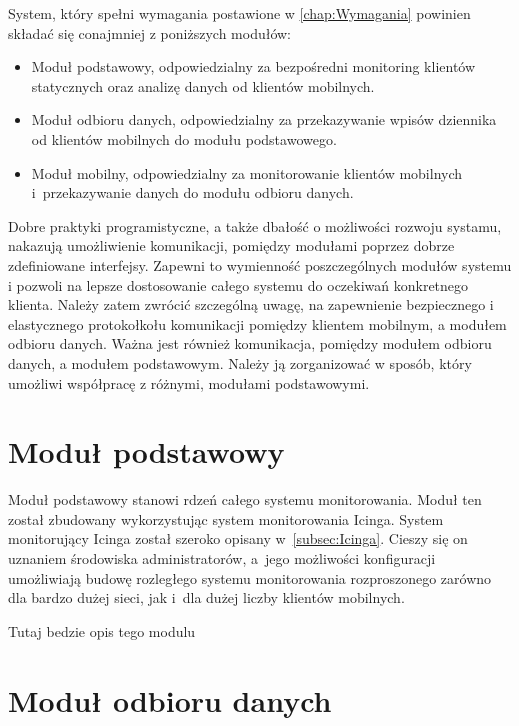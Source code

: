 System, który spełni wymagania postawione w \ref{chap:Wymagania}
powinien składać się conajmniej z poniższych modułów:

\begin{itemize}
\item Moduł podstawowy, odpowiedzialny za bezpośredni monitoring
  klientów statycznych oraz analizę danych od klientów mobilnych.
\item Moduł odbioru danych, odpowiedzialny za przekazywanie wpisów
  dziennika od klientów mobilnych do modułu podstawowego.
\item Moduł mobilny, odpowiedzialny za monitorowanie klientów
  mobilnych i~przekazywanie danych do modułu odbioru danych.
\end{itemize}


Dobre praktyki programistyczne, a także dbałość o możliwości rozwoju
systamu, nakazują umożliwienie komunikacji, pomiędzy modułami poprzez
dobrze zdefiniowane interfejsy. Zapewni to wymienność poszczególnych
modułów systemu i pozwoli na lepsze dostosowanie całego systemu do
oczekiwań konkretnego klienta. Należy zatem zwrócić szczególną uwagę,
na zapewnienie bezpiecznego i elastycznego protokołkołu komunikacji
pomiędzy klientem mobilnym, a modułem odbioru danych. Ważna jest
również komunikacja, pomiędzy modułem odbioru danych, a modułem
podstawowym. Należy ją zorganizować w sposób, który umożliwi
współpracę z różnymi, modułami podstawowymi.


\section[Moduł podstawowy][Moduł podstawowy]{Moduł podstawowy}

Moduł podstawowy stanowi rdzeń całego systemu monitorowania. Moduł ten
został zbudowany wykorzystując system monitorowania Icinga. System
monitorujący Icinga został szeroko opisany
w~\ref{subsec:Icinga}. Cieszy się on uznaniem środowiska
administratorów, a~jego możliwości konfiguracji umożliwiają budowę
rozległego systemu monitorowania rozproszonego zarówno dla bardzo
dużej sieci, jak i~dla dużej liczby klientów mobilnych.

Tutaj bedzie opis tego modulu

\section[Moduł odbioru danych][Moduł odbioru danych]{Moduł odbioru danych}
\label{sec:ModOdbDanych}

